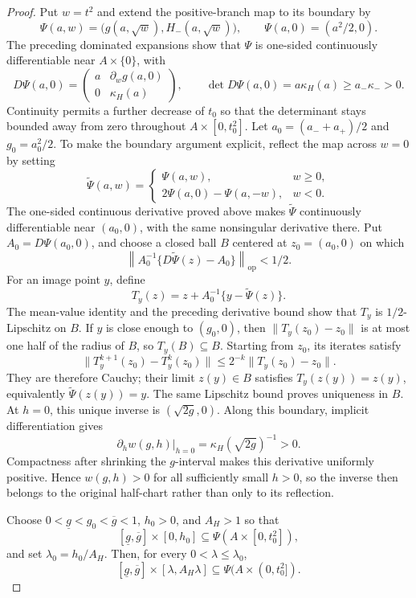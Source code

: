 \documentclass{article}
\begin{document}
\begin{proof}
Put \(w=t^2\) and extend the positive-branch map to its boundary by
\[
\Psi(a,w)=\bigl(g(a,\sqrt w),H_-(a,\sqrt w)\bigr),\qquad
\Psi(a,0)=(a^2/2,0).
\]
The preceding dominated expansions show that \(\Psi\) is one-sided continuously differentiable near \(A\times\{0\}\), with
\[
D\Psi(a,0)=\begin{pmatrix}
a&\partial_w g(a,0)\\
0&\kappa_H(a)
\end{pmatrix},\qquad
\det D\Psi(a,0)=a\kappa_H(a)\ge a_-\kappa_->0.
\]
Continuity permits a further decrease of \(t_0\) so that the determinant stays bounded away from zero throughout \(A\times[0,t_0^2]\).  Let \(a_0=(a_-+a_+)/2\) and \(g_0=a_0^2/2\).  To make the boundary argument explicit, reflect the map across \(w=0\) by setting
\[
\widetilde\Psi(a,w)=
\begin{cases}
\Psi(a,w),&w\ge0,\\
2\Psi(a,0)-\Psi(a,-w),&w<0.
\end{cases}
\]
The one-sided continuous derivative proved above makes \(\widetilde\Psi\) continuously differentiable near \((a_0,0)\), with the same nonsingular derivative there.  Put \(A_0=D\Psi(a_0,0)\), and choose a closed ball \(B\) centered at \(z_0=(a_0,0)\) on which
\[
\left\|A_0^{-1}\{D\widetilde\Psi(z)-A_0\}\right\|_{\mathrm{op}}<1/2.
\]
For an image point \(y\), define
\[
T_y(z)=z+A_0^{-1}\{y-\widetilde\Psi(z)\}.
\]
The mean-value identity and the preceding derivative bound show that \(T_y\) is \(1/2\)-Lipschitz on \(B\).  If \(y\) is close enough to \((g_0,0)\), then \(\|T_y(z_0)-z_0\|\) is at most one half of the radius of \(B\), so \(T_y(B)\subseteq B\).  Starting from \(z_0\), its iterates satisfy
\[
\|T_y^{k+1}(z_0)-T_y^k(z_0)\|\le2^{-k}\|T_y(z_0)-z_0\|.
\]
They are therefore Cauchy; their limit \(z(y)\in B\) satisfies \(T_y(z(y))=z(y)\), equivalently \(\widetilde\Psi(z(y))=y\).  The same Lipschitz bound proves uniqueness in \(B\).  At \(h=0\), this unique inverse is \((\sqrt{2g},0)\).  Along this boundary, implicit differentiation gives
\[
\left.\partial_h w(g,h)\right|_{h=0}=\kappa_H(\sqrt{2g})^{-1}>0.
\]
Compactness after shrinking the \(g\)-interval makes this derivative uniformly positive.  Hence \(w(g,h)>0\) for all sufficiently small \(h>0\), so the inverse then belongs to the original half-chart rather than only to its reflection.

Choose \(0<\underline g<g_0<\overline g<1\), \(h_0>0\), and \(A_H>1\) so that
\[
[\underline g,\overline g]\times[0,h_0]\subseteq\Psi(A\times[0,t_0^2]),
\]
and set \(\lambda_0=h_0/A_H\).  Then, for every \(0<\lambda\le\lambda_0\),
\[
[\underline g,\overline g]\times[\lambda,A_H\lambda]\subseteq
\Psi(A\times(0,t_0^2]).
\]


\end{proof}
\end{document}
